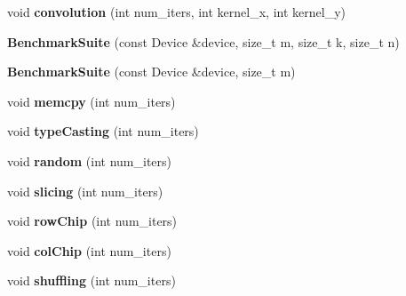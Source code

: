 \begin{DoxyCompactItemize}
\mbox{\label{class_benchmark_suite_ae613f9d381021dc15dad6c86f55ee19b}} 
void {\bfseries convolution} (int num\+\_\+iters, int kernel\+\_\+x, int kernel\+\_\+y)
\item 
\mbox{\label{class_benchmark_suite_a6b9ee7ab131d23fc111d346c5a3c5f02}} 
{\bfseries Benchmark\+Suite} (const Device \&device, size\+\_\+t m, size\+\_\+t k, size\+\_\+t n)
\item 
\mbox{\label{class_benchmark_suite_a9f1263956e5c66e5ecb5aad3f8c8d86b}} 
{\bfseries Benchmark\+Suite} (const Device \&device, size\+\_\+t m)
\item 
\mbox{\label{class_benchmark_suite_a71e21f4a518dec18f7b61fe1f90cf4ce}} 
void {\bfseries memcpy} (int num\+\_\+iters)
\item 
\mbox{\label{class_benchmark_suite_a0789df8b43b1868fc69286063663e313}} 
void {\bfseries type\+Casting} (int num\+\_\+iters)
\item 
\mbox{\label{class_benchmark_suite_ac0fcdc53056b4b4d05aa32c42e18a555}} 
void {\bfseries random} (int num\+\_\+iters)
\item 
\mbox{\label{class_benchmark_suite_a49b8182ae4f802fa8f095ab70a9cba4b}} 
void {\bfseries slicing} (int num\+\_\+iters)
\item 
\mbox{\label{class_benchmark_suite_a313a846461859242eabf7eb4522e6bd8}} 
void {\bfseries row\+Chip} (int num\+\_\+iters)
\item 
\mbox{\label{class_benchmark_suite_acfde6aa82a61fafbc7fc4fc28057e709}} 
void {\bfseries col\+Chip} (int num\+\_\+iters)
\item 
\mbox{\label{class_benchmark_suite_abc6c3f1ea3d7637d703fa8f69703af8d}} 
void {\bfseries shuffling} (int num\+\_\+iters)
\item 
\mbox{\label{class_benchmark_suite_a01d9720c94f4a02cb91d2703df1d7d03}} 

\end{DoxyCompactItemize}
